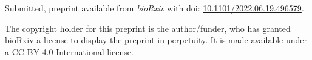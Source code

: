 \vspace{10pt}
\noindent Submitted, preprint available from \textit{bioRxiv} with doi: 
\href{https://doi.org/10.1101/2022.06.19.496579}{10.1101/2022.06.19.496579}.

\vspace{60pt}
\noindent
The copyright holder for this preprint is the author/funder, who has
granted bioRxiv a license to display the preprint in perpetuity. It is
made available under a CC-BY 4.0 International license.

\cleardoublepage


















\restoregeometry

%
